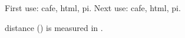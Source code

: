 \documentclass[12pt]{article}
\begin{document}
First use: \gls{cafe}, \gls{html}, \gls{pi}. Next use: \gls{cafe}, \gls{html}, \gls{pi}. 

\Gls{distance} () is measured in . 
\end{document}
